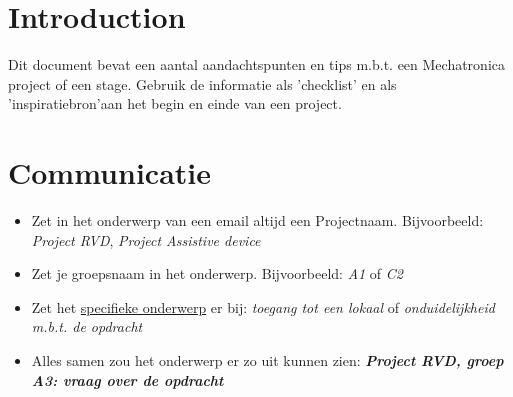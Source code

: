 \documentclass[24pt,a4paper]{article}
\begin{document}
\captionsetup[table]{labelsep=endash}
\captionsetup[figure]{labelsep=endash}

\pagestyle{default}


\section{Introduction}
Dit document bevat een aantal aandachtspunten en tips m.b.t. een Mechatronica project of een stage.
Gebruik de informatie als 'checklist' en als 'inspiratiebron'aan het begin en einde van een project.

\newcommand{\mssep}{
      \setlength{\itemsep}{1pt}
      \setlength{\parskip}{0pt}
      \setlength{\parsep}{0pt}
      \vspace{-1em}
}

\section{Communicatie}
\begin{itemize}
      \mssep
      \item Zet in het onderwerp van een email altijd een Projectnaam. Bijvoorbeeld: \textit{Project RVD}, \textit{Project Assistive device}
      \item Zet je groepsnaam in het onderwerp. Bijvoorbeeld: \textit{A1} of \textit{C2}
      \item Zet het \underline{specifieke onderwerp} er bij: \textit{toegang tot een lokaal} of \textit{onduidelijkheid m.b.t. de opdracht}
      \item Alles samen zou het onderwerp er zo uit kunnen zien: \newline
            \textbf{\textit{Project RVD, groep A3: vraag over de opdracht}
            }\end{itemize}
\end{document}
